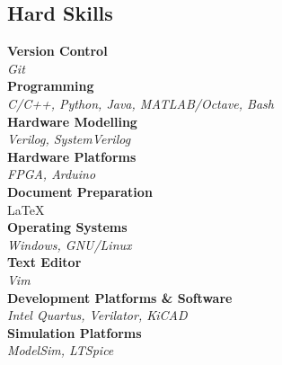 \documentclass[10pt]{article}
\begin{document}
\begin{multicols}{2}
	\columnbreak

	\section*{\Large{Hard Skills} \hrulefill}

	\textbf{Version Control} \\
	\textit{Git} \\

	\noindent
	\textbf{Programming} \\
	\textit{C/C++, Python, Java, MATLAB/Octave, Bash} \\

	\noindent
	\textbf{Hardware Modelling} \\
	\textit{Verilog, SystemVerilog} \\

	\noindent
	\textbf{Hardware Platforms} \\
	\textit{FPGA, Arduino} \\

	\noindent
	\textbf{Document Preparation} \\
	\LaTeX \\

	\noindent
	\textbf{Operating Systems} \\
	\textit{Windows, GNU/Linux} \\

	\noindent
	\textbf{Text Editor} \\
	\textit{Vim} \\

	\noindent
	\textbf{Development Platforms \& Software} \\
	\textit{Intel Quartus, Verilator, KiCAD} \\

	\noindent
	\textbf{Simulation Platforms} \\
	\textit{ModelSim, LTSpice} \\

\end{multicols}
\end{document}
